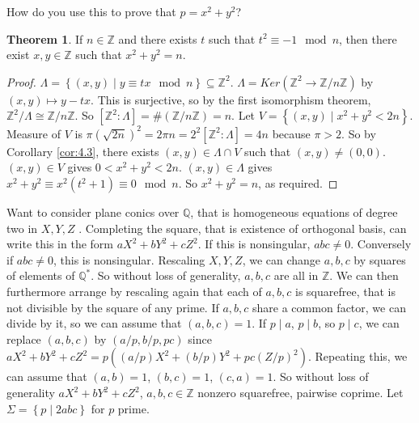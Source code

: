 \documentclass{article}
\newcommand{\Z}{\mathbb{Z}}
\newcommand{\Q}{\mathbb{Q}}
\newcommand{\rb}[1]{\left( #1 \right)}
\renewcommand{\sb}[1]{\left[ #1 \right]}
\newcommand{\cb}[1]{\left\{ #1 \right\}}
\theoremstyle{definition}\newtheorem{definition}{Definition}[section]
\theoremstyle{definition}\newtheorem{remark}[definition]{Remark}
\theoremstyle{definition}\newtheorem*{example}{Example}
\theoremstyle{definition}\newtheorem*{note}{Note}
\newtheorem{theorem}[definition]{Theorem}
\begin{document}
How do you use this to prove that $ p = x^2 + y^2 $?


\begin{theorem}
If $ n \in \Z $ and there exists $ t $ such that $ t^2 \equiv -1 \mod n $, then there exist $ x, y \in \Z $ such that $ x^2 + y^2 = n $.
\end{theorem}

\begin{proof}
$ \Lambda = \cb{\rb{x, y} \mid y \equiv tx \mod n} \subseteq \Z^2 $. $ \Lambda = Ker\rb{\Z^2 \to \Z / n\Z} $ by $ \rb{x, y} \mapsto y - tx $. This is surjective, so by the first isomorphism theorem, $ \Z^2 / \Lambda \cong \Z / n\Z $. So $ \sb{\Z^2 : \Lambda} = \#\rb{\Z / n\Z} = n $. Let $ V = \cb{\rb{x, y} \mid x^2 + y^2 < 2n} $. Measure of $ V $ is $ \pi\rb{\sqrt{2n}}^2 = 2\pi n = 2^2\sb{\Z^2 : \Lambda} = 4n $ because $ \pi > 2 $. So by Corollary \ref{cor:4.3}, there exists $ \rb{x, y} \in \Lambda \cap V $ such that $ \rb{x, y} \ne \rb{0, 0} $. $ \rb{x, y} \in V $ gives $ 0 < x^2 + y^2 < 2n $. $ \rb{x, y} \in \Lambda $ gives $ x^2 + y^2 \equiv x^2\rb{t^2 + 1} \equiv 0 \mod n $. So $ x^2 + y^2 = n $, as required.
\end{proof}

Want to consider plane conics over $ \Q $, that is homogeneous equations of degree two in $ X, Y, Z $ . Completing the square, that is existence of orthogonal basis, can write this in the form $ aX^2 + bY^2 + cZ^2 $. If this is nonsingular, $ abc \ne 0 $. Conversely if $ abc \ne 0 $, this is nonsingular. Rescaling $ X, Y, Z $, we can change $ a, b, c $ by squares of elements of $ \Q^* $. So without loss of generality, $ a, b, c $ are all in $ \Z $. We can then furthermore arrange by rescaling again that each of $ a, b, c $ is squarefree, that is not divisible by the square of any prime. If $ a, b, c $ share a common factor, we can divide by it, so we can assume that $ \rb{a, b, c} = 1 $. If $ p \mid a $, $ p \mid b $, so $ p \mid c $, we can replace $ \rb{a, b, c} $ by $ \rb{a / p, b / p, pc} $ since $ aX^2 + bY^2 + cZ^2 = p\rb{\rb{a / p}X^2 + \rb{b / p}Y^2 + pc\rb{Z / p}^2} $. Repeating this, we can assume that $ \rb{a, b} = 1 $, $ \rb{b, c} = 1 $, $ \rb{c, a} = 1 $. So without loss of generality $ aX^2 + bY^2 + cZ^2 $, $ a, b, c \in \Z $ nonzero squarefree, pairwise coprime. Let $ \Sigma = \cb{p \mid 2abc} $ for $ p $ prime.
\end{document}
